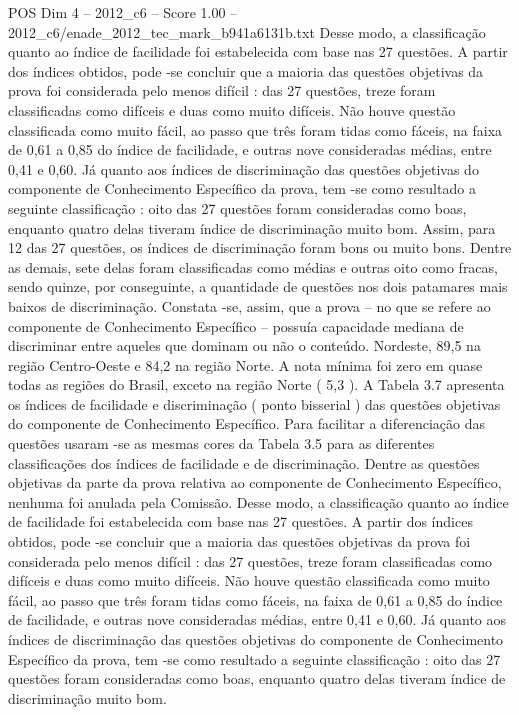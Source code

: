 \begin{textsample}{POS Dim 4 – 2012\_c6 – Score 1.00 – 2012\_c6/enade\_2012\_tec\_mark\_b941a6131b.txt}
Desse modo, a classificação quanto ao índice de facilidade foi estabelecida com base nas 27 questões.
A partir dos índices obtidos, pode -se concluir que a maioria das questões objetivas da prova foi considerada pelo menos difícil : das 27 questões, treze foram classificadas como difíceis e duas como muito difíceis.
Não houve questão classificada como muito fácil, ao passo que três foram tidas como fáceis, na faixa de 0,61 a 0,85 do índice de facilidade, e outras nove consideradas médias, entre 0,41 e 0,60.
Já quanto aos índices de discriminação das questões objetivas do componente de Conhecimento Específico da prova, tem -se como resultado a seguinte classificação : oito das 27 questões foram consideradas como boas, enquanto quatro delas tiveram índice de discriminação muito bom.
Assim, para 12 das 27 questões, os índices de discriminação foram bons ou muito bons.
Dentre as demais, sete delas foram classificadas como médias e outras oito como fracas, sendo quinze, por conseguinte, a quantidade de questões nos dois patamares mais baixos de discriminação.
Constata -se, assim, que a prova – no que se refere ao componente de Conhecimento Específico – possuía capacidade mediana de discriminar entre aqueles que dominam ou não o conteúdo.
Nordeste, 89,5 na região Centro-Oeste e 84,2 na região Norte.
A nota mínima foi zero em quase todas as regiões do Brasil, exceto na região Norte ( 5,3 ).
A Tabela 3.7 apresenta os índices de facilidade e discriminação ( ponto bisserial ) das questões objetivas do componente de Conhecimento Específico.
Para facilitar a diferenciação das questões usaram -se as mesmas cores da Tabela 3.5 para as diferentes classificações dos índices de facilidade e de discriminação.
Dentre as questões objetivas da parte da prova relativa ao componente de Conhecimento Específico, nenhuma foi anulada pela Comissão.
Desse modo, a classificação quanto ao índice de facilidade foi estabelecida com base nas 27 questões.
A partir dos índices obtidos, pode -se concluir que a maioria das questões objetivas da prova foi considerada pelo menos difícil : das 27 questões, treze foram classificadas como difíceis e duas como muito difíceis.
Não houve questão classificada como muito fácil, ao passo que três foram tidas como fáceis, na faixa de 0,61 a 0,85 do índice de facilidade, e outras nove consideradas médias, entre 0,41 e 0,60.
Já quanto aos índices de discriminação das questões objetivas do componente de Conhecimento Específico da prova, tem -se como resultado a seguinte classificação : oito das 27 questões foram consideradas como boas, enquanto quatro delas tiveram índice de discriminação muito bom.

\end{textsample}
